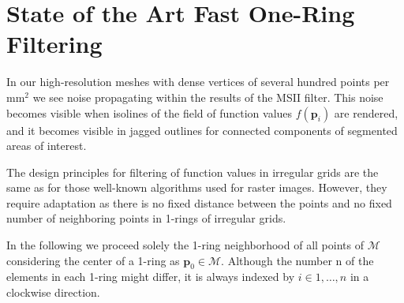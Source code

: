 \documentclass[openany]{book}
\begin{document}
\chapter{State of the Art Fast One-Ring Filtering}
In our high-resolution meshes with dense vertices of several hundred points per 
mm$^2$ we see noise propagating within the results of the MSII filter. This noise 
becomes visible when isolines of the field of function values $f ( \mathbf{p}_i ) $ are 
rendered, and it becomes visible in jagged outlines for connected components of 
segmented areas of interest.

The design principles for filtering of function 
values in irregular grids are the same as for those well-known algorithms used 
for raster images. However, they require adaptation as there is no fixed 
distance between the points and no fixed number of neighboring points in 
1-rings of irregular grids.

In the following we proceed solely the 1-ring neighborhood of all points of 
$\mathcal{M}$ considering the center of a 1-ring as $\mathbf{p}_0 \in 
\mathcal{M}$. Although the number n of the elements in each 1-ring might 
differ, it is always indexed by $i \in {1, \ldots, n}$ in a clockwise
direction. %
\end{document}
